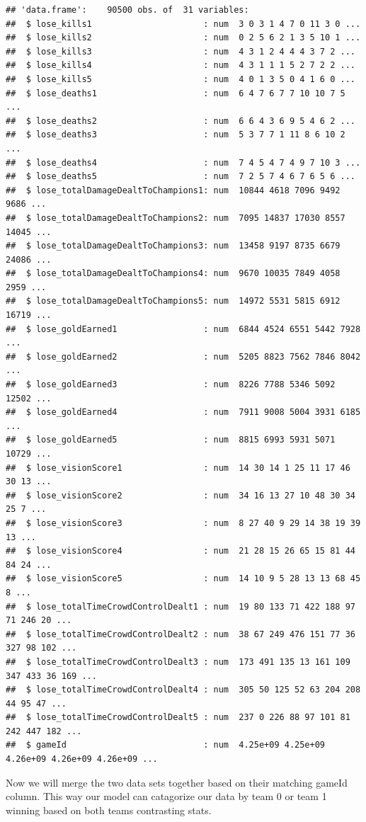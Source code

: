 \documentclass[
]{article}
\begin{document}
\begin{verbatim}
## 'data.frame':    90500 obs. of  31 variables:
##  $ lose_kills1                      : num  3 0 3 1 4 7 0 11 3 0 ...
##  $ lose_kills2                      : num  0 2 5 6 2 1 3 5 10 1 ...
##  $ lose_kills3                      : num  4 3 1 2 4 4 4 3 7 2 ...
##  $ lose_kills4                      : num  4 3 1 1 1 5 2 7 2 2 ...
##  $ lose_kills5                      : num  4 0 1 3 5 0 4 1 6 0 ...
##  $ lose_deaths1                     : num  6 4 7 6 7 7 10 10 7 5 ...
##  $ lose_deaths2                     : num  6 6 4 3 6 9 5 4 6 2 ...
##  $ lose_deaths3                     : num  5 3 7 7 1 11 8 6 10 2 ...
##  $ lose_deaths4                     : num  7 4 5 4 7 4 9 7 10 3 ...
##  $ lose_deaths5                     : num  7 2 5 7 4 6 7 6 5 6 ...
##  $ lose_totalDamageDealtToChampions1: num  10844 4618 7096 9492 9686 ...
##  $ lose_totalDamageDealtToChampions2: num  7095 14837 17030 8557 14045 ...
##  $ lose_totalDamageDealtToChampions3: num  13458 9197 8735 6679 24086 ...
##  $ lose_totalDamageDealtToChampions4: num  9670 10035 7849 4058 2959 ...
##  $ lose_totalDamageDealtToChampions5: num  14972 5531 5815 6912 16719 ...
##  $ lose_goldEarned1                 : num  6844 4524 6551 5442 7928 ...
##  $ lose_goldEarned2                 : num  5205 8823 7562 7846 8042 ...
##  $ lose_goldEarned3                 : num  8226 7788 5346 5092 12502 ...
##  $ lose_goldEarned4                 : num  7911 9008 5004 3931 6185 ...
##  $ lose_goldEarned5                 : num  8815 6993 5931 5071 10729 ...
##  $ lose_visionScore1                : num  14 30 14 1 25 11 17 46 30 13 ...
##  $ lose_visionScore2                : num  34 16 13 27 10 48 30 34 25 7 ...
##  $ lose_visionScore3                : num  8 27 40 9 29 14 38 19 39 13 ...
##  $ lose_visionScore4                : num  21 28 15 26 65 15 81 44 84 24 ...
##  $ lose_visionScore5                : num  14 10 9 5 28 13 13 68 45 8 ...
##  $ lose_totalTimeCrowdControlDealt1 : num  19 80 133 71 422 188 97 71 246 20 ...
##  $ lose_totalTimeCrowdControlDealt2 : num  38 67 249 476 151 77 36 327 98 102 ...
##  $ lose_totalTimeCrowdControlDealt3 : num  173 491 135 13 161 109 347 433 36 169 ...
##  $ lose_totalTimeCrowdControlDealt4 : num  305 50 125 52 63 204 208 44 95 47 ...
##  $ lose_totalTimeCrowdControlDealt5 : num  237 0 226 88 97 101 81 242 447 182 ...
##  $ gameId                           : num  4.25e+09 4.25e+09 4.26e+09 4.26e+09 4.26e+09 ...
\end{verbatim}

Now we will merge the two data sets together based on their matching
gameId column. This way our model can catagorize our data by team 0 or
team 1 winning based on both teams contrasting stats.
\end{document}
